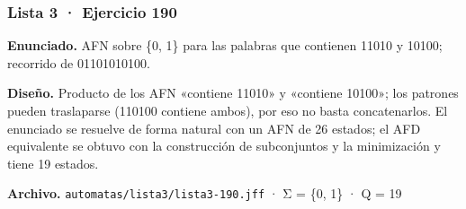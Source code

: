 
\hypertarget{lista-3-ejercicio-190}{%
\subsubsection{Lista 3 · Ejercicio 190}\label{lista-3-ejercicio-190}}

\textbf{Enunciado.} AFN sobre \{0, 1\} para las palabras que contienen 11010 y 10100; recorrido de 01101010100.

\textbf{Diseño.} Producto de los AFN «contiene 11010» y «contiene 10100»; los patrones pueden traslaparse (110100 contiene ambos), por eso no basta concatenarlos. El enunciado se resuelve de forma natural con un AFN de 26 estados; el AFD equivalente se obtuvo con la construcción de subconjuntos y la minimización y tiene 19 estados.

\textbf{Archivo.} \texttt{automatas/lista3/lista3-190.jff} · Σ = \{0, 1\} · \textbar Q\textbar{} = 19

